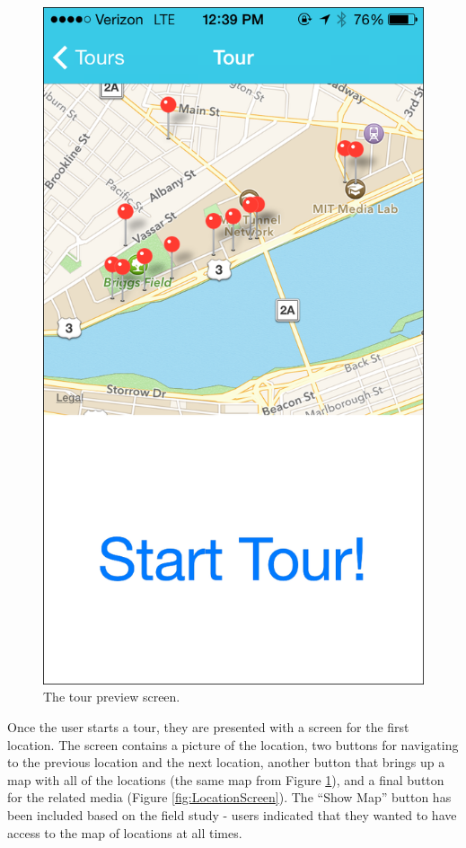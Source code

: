 \documentclass{sigchi}
\begin{document}
\begin{figure}
\centering
\includegraphics[width=0.7\linewidth]{./TourPreview}
\caption{The tour preview screen.}
\label{fig:TourPreview}
\end{figure}

Once the user starts a tour, they are presented with a screen for the first location. The screen contains a picture of the location, two buttons for navigating to the previous location and the next location, another button that brings up a map with all of the locations (the same map from Figure \ref{fig:TourPreview}), and a final button for the related media (Figure \ref{fig:LocationScreen}). The ``Show Map'' button has been included based on the field study - users indicated that they wanted to have access to the map of locations at all times.
\end{document}
